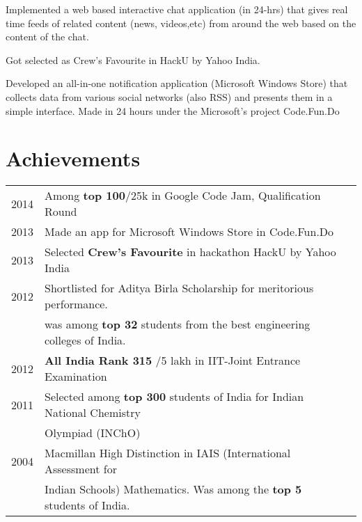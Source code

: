 \documentclass[a4paper]{deedy-resume} %
\begin{document}
\begin{minipage}[t]{0.66\textwidth}


\begin{tightitemize}
\item Implemented a web based interactive chat application (in 24-hrs) that gives real time feeds of related content (news, videos,etc) from around the web based on the content of the chat.
\item Got selected as Crew's Favourite in HackU by Yahoo India.
\end{tightitemize}

\sectionspace %




Developed an all-in-one notification application (Microsoft Windows Store) that collects data from various social networks (also RSS) and presents them in a simple interface.
Made in 24 hours under the Microsoft's project Code.Fun.Do 


\sectionspace %


\section{Achievements} 

\begin{tabular}{rll}
2014	& Among \textbf{top 100}/25k in Google Code Jam, Qualification Round\\
2013	& Made an app for Microsoft Windows Store in Code.Fun.Do\\
2013	& Selected \textbf {Crew's Favourite} in hackathon HackU by Yahoo India\\
2012 & Shortlisted for Aditya Birla Scholarship for meritorious performance.\\
& was among \textbf{top 32} students from the best engineering colleges of India.\\
2012 & \textbf{All India Rank 315} /5 lakh in IIT-Joint Entrance Examination \\
2011 & Selected among \textbf {top 300} students of India for Indian National Chemistry \\ & Olympiad (INChO)\\
2004 & Macmillan High Distinction in IAIS (International Assessment for \\
& Indian Schools) Mathematics. Was among the \textbf{top 5} students of India.



\end{tabular}
\end{minipage}
\end{document}
